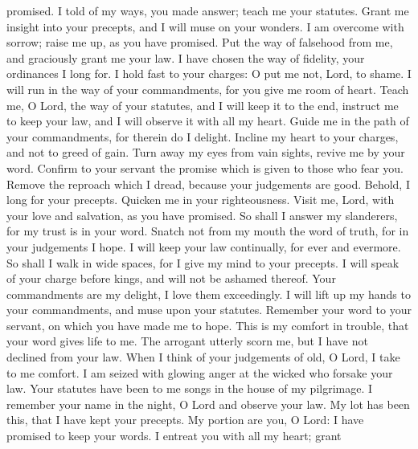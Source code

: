 promised.  I told of my ways, you made answer; teach me
your statutes.  Grant me insight into your precepts, and I
will muse on your wonders.  I am overcome with sorrow;
raise me up, as you have promised.  Put the way of
falsehood from me, and graciously grant me your law.  I
have chosen the way of fidelity, your ordinances I long for.
 I hold fast to your charges: O put me not, Lord, to shame.
 I will run in the way of your commandments, for you give
me room of heart.  Teach me, O Lord, the way of your
statutes, and I will keep it to the end,  instruct me to
keep your law, and I will observe it with all my heart. 
Guide me in the path of your commandments, for therein do I delight.
 Incline my heart to your charges, and not to greed of
gain.  Turn away my eyes from vain sights, revive me by
your word.  Confirm to your servant the promise which is
given to those who fear you.  Remove the reproach which I
dread, because your judgements are good.  Behold, I long
for your precepts. Quicken me in your righteousness.  Visit
me, Lord, with your love and salvation, as you have promised.
 So shall I answer my slanderers, for my trust is in your
word.  Snatch not from my mouth the word of truth, for in
your judgements I hope.  I will keep your law continually,
for ever and evermore.  So shall I walk in wide spaces, for
I give my mind to your precepts.  I will speak of your
charge before kings, and will not be ashamed thereof.  Your
commandments are my delight, I love them exceedingly.  I
will lift up my hands to your commandments, and muse upon your statutes.
 Remember your word to your servant, on which you have made
me to hope.  This is my comfort in trouble, that your word
gives life to me.  The arrogant utterly scorn me, but I
have not declined from your law.  When I think of your
judgements of old, O Lord, I take to me comfort.  I am
seized with glowing anger at the wicked who forsake your law.
 Your statutes have been to me songs in the house of my
pilgrimage.  I remember your name in the night, O Lord and
observe your law.  My lot has been this, that I have kept
your precepts.  My portion are you, O Lord: I have promised
to keep your words.  I entreat you with all my heart; grant
